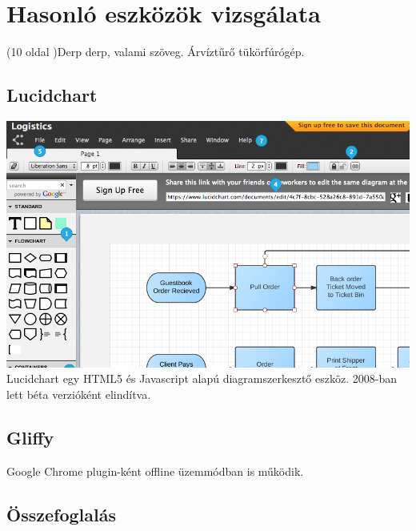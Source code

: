 \chapter{Hasonló eszközök vizsgálata}
(10 oldal )Derp derp, valami szöveg. Árvíztűrő tükörfúrógép.


\section{Lucidchart}

\includegraphics[width=160mm,keepaspectratio]{figures/lucid.png}\\

Lucidchart egy HTML5 és Javascript alapú diagramszerkesztő eszköz.  2008-ban lett béta verzióként elindítva.

 


\section{Gliffy}

Google Chrome plugin-ként offline üzemmódban is működik.


\section{Összefoglalás}


